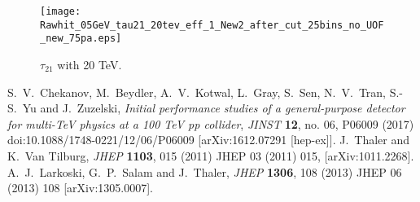 \documentclass[a4paper]{PoS}
\begin{document}
\begin{figure}
\begin{center}
 \texttt{[image: Rawhit\_05GeV\_tau21\_20tev\_eff\_1\_New2\_after\_cut\_25bins\_no\_UOF\_new\_75pa.eps]}
\end{center}
\caption{$\tau_{21}$ with 20 TeV.}
\label{1}
\end{figure}
\begin{thebibliography}{99}
  S.~V.~Chekanov, M.~Beydler, A.~V.~Kotwal, L.~Gray, S.~Sen, N.~V.~Tran, S.-S.~Yu and J.~Zuzelski,
  \emph{Initial performance studies of a general-purpose detector for multi-TeV physics at a 100 TeV pp collider},
  \emph{JINST} {\bf 12}, no. 06, P06009 (2017)
  doi:10.1088/1748-0221/12/06/P06009
  [arXiv:1612.07291 [hep-ex]].
  J.~Thaler and K.~Van Tilburg,
  \emph{JHEP} {\bf 1103}, 015 (2011)
  JHEP 03 (2011) 015, 
  [arXiv:1011.2268].
  A.~J.~Larkoski, G.~P.~Salam and J.~Thaler,
  \emph{JHEP} {\bf 1306}, 108 (2013)
  JHEP 06 (2013) 108
  [arXiv:1305.0007].

\end{thebibliography}
\end{document}

